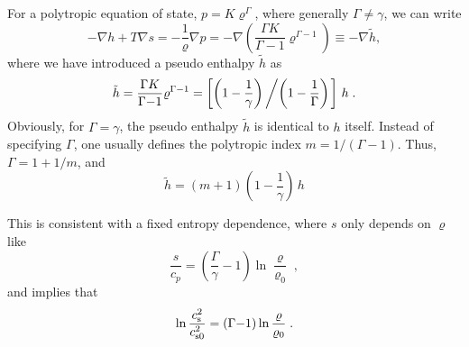 \documentclass[\mydriver,12pt,twoside,notitlepage,a4paper]{article}
\newcommand{\grad}    {\nabla}
\begin{document}
For a polytropic equation of state, $p=K\varrho^\Gamma$, where generally
$\Gamma\neq\gamma$, we can write
\begin{equation}
  -\grad h+T\grad s
  = -\frac{1}{\varrho}\grad p
  = -\grad\left(\frac{\Gamma K}{\Gamma{-}1}\varrho^{\Gamma{-}1}\right)
\equiv-\grad\tilde{h},
\end{equation}
where we have introduced a pseudo enthalpy $\tilde{h}$ as
\begin{equation}
  \tilde{h} = \frac{\Gamma K}{\Gamma{-}1}\varrho^{\Gamma{-}1}
  =\left[\left(1-\frac{1}{\gamma}\right)
    \left/\left(1-\frac{1}{\Gamma}\right)\right.\right]\,h\; .
\end{equation}
Obviously, for $\Gamma=\gamma$, the pseudo enthalpy $\tilde{h}$ is
identical to $h$ itself.
Instead of specifying $\Gamma$, one usually defines the polytropic
index $m=1/(\Gamma{-}1)$. Thus, $\Gamma=1+1/m$, and
\begin{equation}\label{hhtilde}
  \tilde{h}=(m{+}1)\left(1-\frac{1}{\gamma}\right)\,h
\end{equation}

This is consistent with a fixed entropy dependence,
where $s$ only depends on $\varrho$ like
\begin{equation}
  \frac{s}{c_p} = \left( \frac{\Gamma}{\gamma} - 1 \right)
                        \ln\frac{\varrho}{\varrho_0} \; ,
\end{equation}
and implies that
\begin{equation}
  \ln \frac{c_{\rm s}^2}{c_{\rm s0}^2}
  = (\Gamma{-}1) \ln\frac{\varrho}{\varrho_0} \; .
\end{equation}
\end{document}
